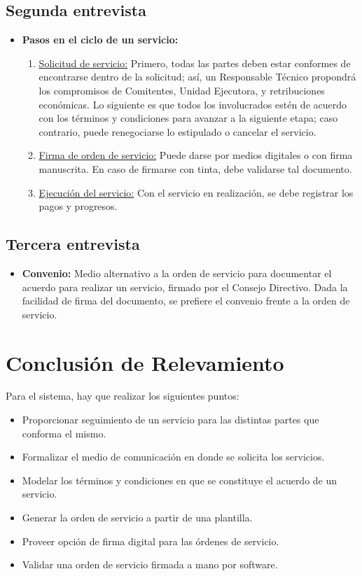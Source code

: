 \subsection{Segunda entrevista}
\begin{itemize}
	\item \textbf{Pasos en el ciclo de un servicio:}
	\begin{enumerate}
		\item \underline{Solicitud de servicio:}
		Primero, todas las partes deben estar conformes
		de encontrarse dentro de la solicitud; as\'i,
		un Responsable T\'ecnico propondr\'a los
		compromisos de Comitentes, Unidad Ejecutora, y
		retribuciones econ\'omicas. Lo siguiente es
		que todos los involucrados est\'en de acuerdo
		con los t\'erminos y condiciones para avanzar
		a la siguiente etapa; caso contrario, puede
		renegociarse lo estipulado o cancelar el
		servicio.
		\item \underline{Firma de orden de servicio:}
		Puede darse por medios digitales o con firma
		manuscrita. En caso de firmarse con tinta,
		debe validarse tal documento.
		\item \underline{Ejecuci\'on del servicio:}
		Con el servicio en realizaci\'on, se debe
		registrar los pagos y progresos.
	\end{enumerate}
\end{itemize}
\subsection{Tercera entrevista}
\begin{itemize}
	\item \textbf{Convenio:} Medio alternativo a
	la orden de servicio para documentar el acuerdo
	para realizar un servicio, firmado por el
	Consejo Directivo. Dada la facilidad de firma
	del documento, se prefiere el convenio frente
	a la orden de servicio.
\end{itemize}
\section[Conclusi\'on]{Conclusi\'on de Relevamiento}
\normalsize{ \indent
Para el sistema, hay que realizar los siguientes puntos:
}
\begin{itemize}
	\item Proporcionar seguimiento de un servicio para
	las distintas partes que conforma el mismo.
	\item Formalizar el medio de comunicaci\'on en donde
	se solicita los servicios.
	\item Modelar los t\'erminos y condiciones en que se
	constituye el acuerdo de un servicio.
	\item Generar la orden de servicio a partir de una
	plantilla.
	\item Proveer opci\'on de firma digital para las
	\'ordenes de servicio.
	\item Validar una orden de servicio firmada a mano
	por software.	
\end{itemize}
